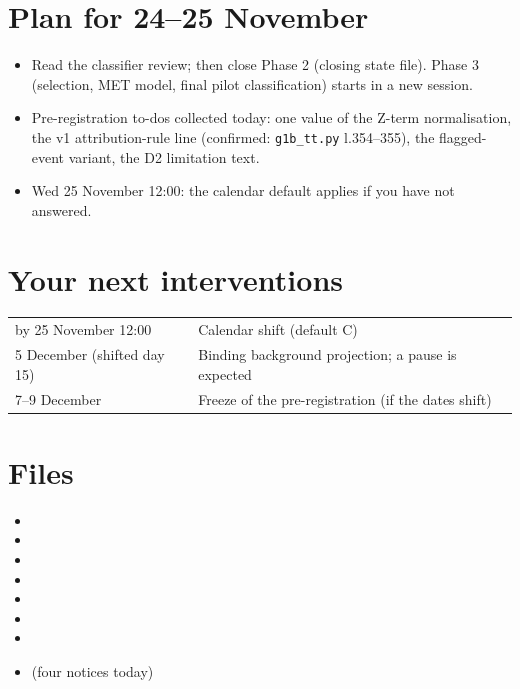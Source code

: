 \documentclass[11pt,a4paper]{article}
\begin{document}
\section{Plan for 24--25 November}
\begin{itemize}
\item Read the classifier review; then close Phase 2 (closing state file). Phase 3 (selection, MET model, final pilot
      classification) starts in a new session.
\item Pre-registration to-dos collected today: one value of the Z-term normalisation, the v1 attribution-rule
      line (confirmed: \texttt{g1b\_tt.py} l.354--355), the flagged-event variant, the D2 limitation text.
\item Wed 25 November 12:00: the calendar default applies if you have not answered.
\end{itemize}

\section{Your next interventions}
\begin{center}
\begin{tabular}{L{4.2cm}L{10.0cm}}
\toprule
by 25 November 12:00 & Calendar shift (default C) \\
5 December (shifted day 15) & Binding background projection; a pause is expected \\
7--9 December & Freeze of the pre-registration (if the dates shift) \\
\bottomrule
\end{tabular}
\end{center}

\section*{Files}
\begin{itemize}
\item {}
\item {}
\item {}
\item {}
\item {}
\item {}
\item {}
\item {} (four notices today)
\end{itemize}
\end{document}
